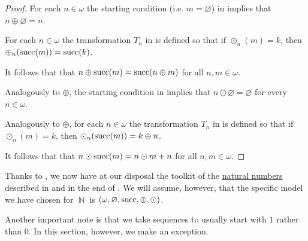 \begin{proof}
   For each \( n \in \omega \) the starting condition (i.e. \( m = \varnothing \)) in  implies that \( n \oplus \varnothing = n \).

   For each \( n \in \omega \) the transformation \( T_n \) in  is defined so that if \( \oplus_n(m) = k \), then \( \oplus_n(\operatorname{succ}(m)) = \operatorname{succ}(k) \).

  It follows that that \( n \oplus \operatorname{succ}(m) = \operatorname{succ}(n \oplus m) \) for all \( n, m \in \omega \).

   Analogously to \( \oplus \), the starting condition in  implies that \( n \odot \varnothing = \varnothing \) for every \( n \in \omega \).

   Analogously to \( \oplus \), for each \( n \in \omega \) the transformation \( T_n \) in  is defined so that if \( \odot_n(m) = k \), then \( \odot_n(\operatorname{succ}(m)) = k \oplus n \).

  It follows that that \( n \odot \operatorname{succ}(m) = n \odot m + n \) for all \( n, m \in \omega \).
\end{proof}

\begin{remark}\label{rem:natural_number_availability_zfc}
  Thanks to , we now have at our disposal the toolkit of the \hyperref[def:natural_numbers]{natural numbers} described in  and in the end of . We will assume, however, that the specific model we have chosen for \( \BbbN \) is \( (\omega, \varnothing, \operatorname{succ}, \oplus, \odot) \).

  Another important note is that we take sequences to usually start with \( 1 \) rather than \( 0 \). In this section, however, we make an exception.
\end{remark}

